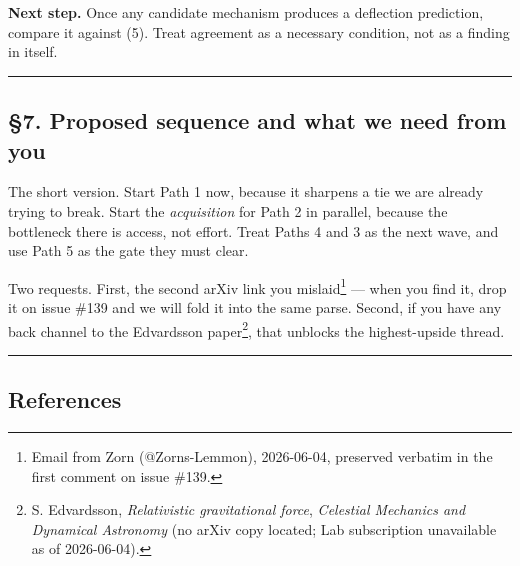 \documentclass[
  11pt,
]{article}
\begin{document}
\textbf{Next step.} Once any candidate mechanism produces a deflection
prediction, compare it against (5). Treat agreement as a necessary
condition, not as a finding in itself.

\begin{center}\rule{0.5\linewidth}{0.5pt}\end{center}

\hypertarget{proposed-sequence-and-what-we-need-from-you}{%
\subsection{§7. Proposed sequence and what we need from
you}\label{proposed-sequence-and-what-we-need-from-you}}

The short version. Start Path 1 now, because it sharpens a tie we are
already trying to break. Start the \emph{acquisition} for Path 2 in
parallel, because the bottleneck there is access, not effort. Treat
Paths 4 and 3 as the next wave, and use Path 5 as the gate they must
clear.

Two requests. First, the second arXiv link you mislaid\footnote{Email
  from Zorn (@Zorns-Lemmon), 2026-06-04, preserved verbatim in the first
  comment on issue \#139.} --- when you find it, drop it on issue \#139
and we will fold it into the same parse. Second, if you have any back
channel to the Edvardsson paper\footnote{S. Edvardsson,
  \emph{Relativistic gravitational force}, \emph{Celestial Mechanics and
  Dynamical Astronomy} (no arXiv copy located; Lab subscription
  unavailable as of 2026-06-04).}, that unblocks the highest-upside
thread.

\begin{center}\rule{0.5\linewidth}{0.5pt}\end{center}

\hypertarget{references}{%
\subsection{References}\label{references}}
\end{document}
